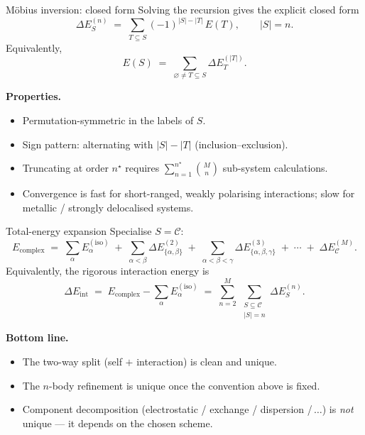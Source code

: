 \documentclass[aspectratio=169,11pt]{beamer}
\newcommand{\Eint}{\Delta E_{\mathrm{int}}}
\newcommand{\Eiso}{E^{(\mathrm{iso})}}
\newcommand{\Ecpl}{E_{\mathrm{complex}}}
\begin{document}
\begin{frame}{M\"obius inversion: closed form}
Solving the recursion gives the explicit closed form
\[
\boxed{\;
\Delta E^{(n)}_{S}
\;=\;\sum_{T\subseteq S}(-1)^{|S|-|T|}\,E(T),\qquad |S|=n.\;}
\]
Equivalently,
\[
E(S)\;=\;\sum_{\varnothing\ne T\subseteq S}\Delta E^{(|T|)}_T.
\]

\medskip
\textbf{Properties.}
\begin{itemize}\setlength\itemsep{2pt}
\item Permutation-symmetric in the labels of $S$.
\item Sign pattern: alternating with $|S|-|T|$ (inclusion--exclusion).
\item Truncating at order $n^\star$ requires
$\sum_{n=1}^{n^\star}\binom{M}{n}$ sub-system calculations.
\item Convergence is fast for short-ranged, weakly polarising
interactions; slow for metallic / strongly delocalised systems.
\end{itemize}
\end{frame}

\begin{frame}{Total-energy expansion}
\small
Specialise $S=\mathcal{C}$:
\[
\boxed{\;
\Ecpl
\;=\;\sum_{\alpha}\Eiso_\alpha
\;+\;\sum_{\alpha<\beta}\Delta E^{(2)}_{\{\alpha,\beta\}}
\;+\;\sum_{\alpha<\beta<\gamma}\Delta E^{(3)}_{\{\alpha,\beta,\gamma\}}
\;+\;\cdots
\;+\;\Delta E^{(M)}_{\mathcal{C}}.\;}
\]
Equivalently, the rigorous interaction energy is
\[
\Eint \;=\; \Ecpl - \sum_\alpha\Eiso_\alpha
\;=\;\sum_{n=2}^{M}\,\sum_{\substack{S\subseteq\mathcal{C}\\|S|=n}}\Delta E^{(n)}_{S}.
\]

\textbf{Bottom line.}
\begin{itemize}\setlength\itemsep{1pt}
\item The two-way split (self $+$ interaction) is clean and unique.
\item The $n$-body refinement is unique once the convention above is fixed.
\item Component decomposition (electrostatic / exchange / dispersion
/$\,\dots$) is \emph{not} unique --- it depends on the chosen scheme.
\end{itemize}
\end{frame}
\end{document}
